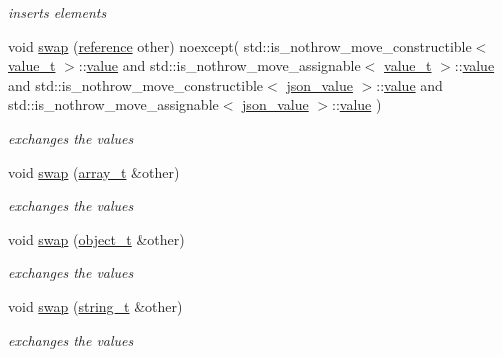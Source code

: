 \begin{DoxyCompactItemize}
\begin{DoxyCompactList}\small\item\em inserts elements \end{DoxyCompactList}\item 
void \hyperlink{classnlohmann_1_1basic__json_af77614992e38b355b9213940051cc582}{swap} (\hyperlink{classnlohmann_1_1basic__json_a3ec8e17be8732fe436e9d6733f52b7a3}{reference} other) noexcept(                       std\+::is\+\_\+nothrow\+\_\+move\+\_\+constructible$<$ \hyperlink{classnlohmann_1_1basic__json_a231b02148577b69a154b2ce2c87a5522}{value\+\_\+t} $>$\+::\hyperlink{classnlohmann_1_1basic__json_a0a2cbbd95862a623e7dc5c37e67dead0}{value} and                       std\+::is\+\_\+nothrow\+\_\+move\+\_\+assignable$<$ \hyperlink{classnlohmann_1_1basic__json_a231b02148577b69a154b2ce2c87a5522}{value\+\_\+t} $>$\+::\hyperlink{classnlohmann_1_1basic__json_a0a2cbbd95862a623e7dc5c37e67dead0}{value} and                       std\+::is\+\_\+nothrow\+\_\+move\+\_\+constructible$<$ \hyperlink{unionnlohmann_1_1basic__json_1_1json__value}{json\+\_\+value} $>$\+::\hyperlink{classnlohmann_1_1basic__json_a0a2cbbd95862a623e7dc5c37e67dead0}{value} and                       std\+::is\+\_\+nothrow\+\_\+move\+\_\+assignable$<$ \hyperlink{unionnlohmann_1_1basic__json_1_1json__value}{json\+\_\+value} $>$\+::\hyperlink{classnlohmann_1_1basic__json_a0a2cbbd95862a623e7dc5c37e67dead0}{value}       )
\begin{DoxyCompactList}\small\item\em exchanges the values \end{DoxyCompactList}\item 
void \hyperlink{classnlohmann_1_1basic__json_a8209621de6184d9eabe136b7c8f61935}{swap} (\hyperlink{classnlohmann_1_1basic__json_ab00b882d39306d663c23dab110f5cae0}{array\+\_\+t} \&other)
\begin{DoxyCompactList}\small\item\em exchanges the values \end{DoxyCompactList}\item 
void \hyperlink{classnlohmann_1_1basic__json_a38ee0f09a318d003add75e0787040794}{swap} (\hyperlink{classnlohmann_1_1basic__json_a0ac9894c9de8dc551cf2e5f1c605537f}{object\+\_\+t} \&other)
\begin{DoxyCompactList}\small\item\em exchanges the values \end{DoxyCompactList}\item 
void \hyperlink{classnlohmann_1_1basic__json_a86089c703a2e563b9f760c2f8408efa7}{swap} (\hyperlink{classnlohmann_1_1basic__json_ab63e618bbb0371042b1bec17f5891f42}{string\+\_\+t} \&other)
\begin{DoxyCompactList}\small\item\em exchanges the values \end{DoxyCompactList}\end{DoxyCompactItemize}
